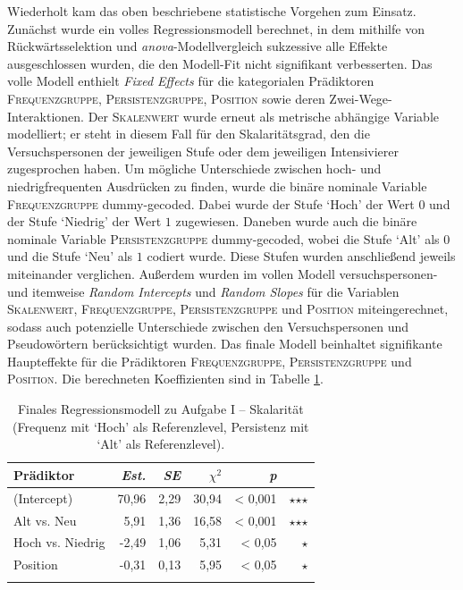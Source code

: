 Wiederholt kam das oben beschriebene statistische Vorgehen zum Einsatz. Zunächst wurde ein volles Regressionsmodell berechnet, in dem mithilfe von Rückwärtsselektion und \textit{anova}-Modellvergleich sukzessive alle Effekte ausgeschlossen wurden, die den Modell-Fit nicht signifikant verbesserten. Das volle Modell enthielt \textit{Fixed Effects} für die kategorialen Prädiktoren \textsc{Frequenzgruppe}, \textsc{Persistenzgruppe}, \textsc{Position} sowie deren Zwei-Wege-Interaktionen. Der \textsc{Skalenwert} wurde erneut als metrische abhängige Variable modelliert; er steht in diesem Fall für den Skalaritätsgrad, den die Versuchspersonen der jeweiligen Stufe oder dem jeweiligen Intensivierer zugesprochen haben. Um mögliche Unterschiede zwischen hoch- und niedrigfrequenten Ausdrücken zu finden, wurde die binäre nominale Variable \textsc{Frequenzgruppe} dummy-gecoded. Dabei wurde der Stufe `Hoch' der {Wert $0$} und der Stufe `Niedrig' der {Wert $1$} zugewiesen. Daneben wurde auch die binäre nominale Variable \textsc{Persistenzgruppe} dummy-gecoded, wobei die Stufe `Alt' als $0$ und die Stufe `Neu' als $1$ codiert wurde. Diese Stufen wurden anschließend jeweils miteinander verglichen. Außerdem wurden im vollen Modell versuchspersonen- und itemweise \textit{Random Intercepts} und \textit{Random Slopes} für die Variablen \textsc{Skalenwert}, \textsc{Frequenzgruppe}, \textsc{Persistenzgruppe} und \textsc{Position} miteingerechnet, sodass auch potenzielle Unterschiede zwischen den Versuchspersonen und Pseudowörtern berücksichtigt wurden. Das finale Modell beinhaltet signifikante Haupteffekte für die Prädiktoren \textsc{Frequenzgruppe}, \textsc{Persistenzgruppe} und \textsc{Position}. Die berechneten Koeffizienten sind in {Tabelle \ref{LinRea0100}}.

\begin{table}
\begin{tabularx}{.8\textwidth}{Xrrrrr}
\lsptoprule
Prädiktor & \textit{Est.} & \textit{SE} & \textit{$\chi$$^{2}$} & \textit{p} & \\
\midrule
(Intercept) & 70,96 & 2,29 & 30,94 & < 0,001 & $\star$$\star$$\star$\\
Alt vs. Neu & \textcolor{white}{-}5,91 & 1,36 & 16,58 & < 0,001 & $\star$$\star$$\star$\\
Hoch vs. Niedrig & -2,49 & 1,06 & \textcolor{white}{-}5,31 & < 0,05 & $\star$\\
Position & -0,31 & 0,13 & \textcolor{white}{-}5,95 & < 0,05 & $\star$\\
\lspbottomrule
\end{tabularx}
\caption[Finales Regressionsmodell zu Aufgabe I von Experiment 1 (Frequenz mit `Hoch' als Referenzlevel, Persistenz mit `Alt' als Referenzlevel)]{Finales Regressionsmodell zu Aufgabe I -- Skalarität (Frequenz mit `Hoch' als Referenzlevel, Persistenz mit `Alt' als Referenzlevel).}
\label{LinRea0100}
\end{table}

